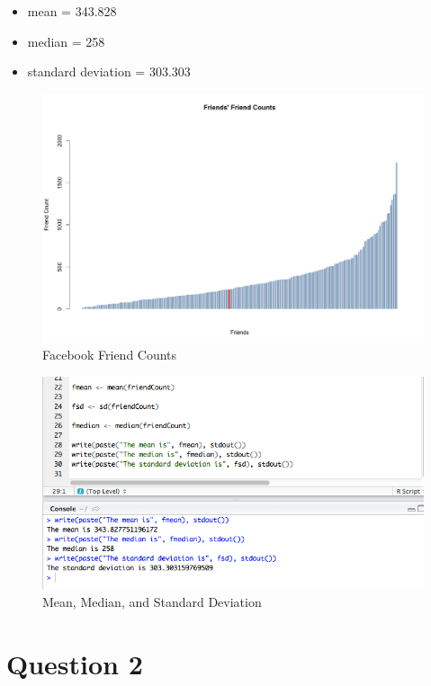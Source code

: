 \documentclass{article}
\begin{document}
\begin{itemize}
\item mean = 343.828
\item median = 258
\item standard deviation = 303.303
\end{itemize}

\begin{figure}[H]
\centering
\includegraphics[scale=0.40]{q1/FriendsFriendCounts}
\caption{Facebook Friend Counts}
\label{friendsfriendcounts}
\end{figure}

\begin{figure}[H]
\centering
\includegraphics[scale=0.50]{q1/statsoutput}
\caption{Mean, Median, and Standard Deviation}
\label{statsoutputfriends}
\end{figure}


\newpage

\section*{Question 2}
\end{document}
